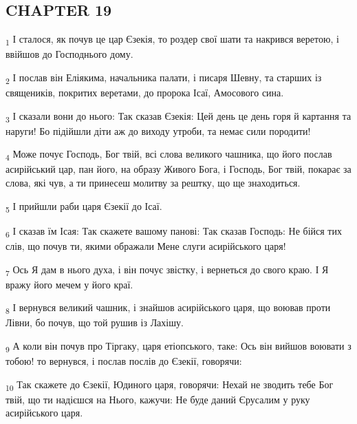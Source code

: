 \subsection{CHAPTER 19}
\begin{tcolorbox}
\textsubscript{1} І сталося, як почув це цар Єзекія, то роздер свої шати та накрився веретою, і ввійшов до Господнього дому.
\end{tcolorbox}
\begin{tcolorbox}
\textsubscript{2} І послав він Еліякима, начальника палати, і писаря Шевну, та старших із священиків, покритих веретами, до пророка Ісаї, Амосового сина.
\end{tcolorbox}
\begin{tcolorbox}
\textsubscript{3} І сказали вони до нього: Так сказав Єзекія: Цей день це день горя й картання та наруги! Бо підійшли діти аж до виходу утроби, та немає сили породити!
\end{tcolorbox}
\begin{tcolorbox}
\textsubscript{4} Може почує Господь, Бог твій, всі слова великого чашника, що його послав асирійський цар, пан його, на образу Живого Бога, і Господь, Бог твій, покарає за слова, які чув, а ти принесеш молитву за рештку, що ще знаходиться.
\end{tcolorbox}
\begin{tcolorbox}
\textsubscript{5} І прийшли раби царя Єзекії до Ісаї.
\end{tcolorbox}
\begin{tcolorbox}
\textsubscript{6} І сказав їм Ісая: Так скажете вашому панові: Так сказав Господь: Не бійся тих слів, що почув ти, якими ображали Мене слуги асирійського царя!
\end{tcolorbox}
\begin{tcolorbox}
\textsubscript{7} Ось Я дам в нього духа, і він почує звістку, і вернеться до свого краю. І Я вражу його мечем у його краї.
\end{tcolorbox}
\begin{tcolorbox}
\textsubscript{8} І вернувся великий чашник, і знайшов асирійського царя, що воював проти Лівни, бо почув, що той рушив із Лахішу.
\end{tcolorbox}
\begin{tcolorbox}
\textsubscript{9} А коли він почув про Тіргаку, царя етіопського, таке: Ось він вийшов воювати з тобою! то вернувся, і послав послів до Єзекії, говорячи:
\end{tcolorbox}
\begin{tcolorbox}
\textsubscript{10} Так скажете до Єзекії, Юдиного царя, говорячи: Нехай не зводить тебе Бог твій, що ти надієшся на Нього, кажучи: Не буде даний Єрусалим у руку асирійського царя.
\end{tcolorbox}

